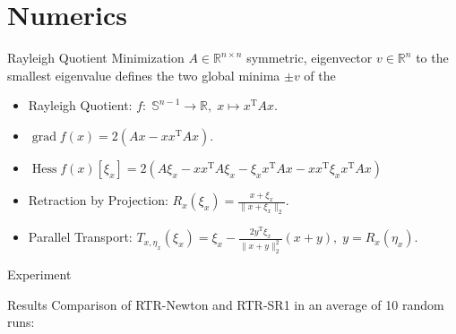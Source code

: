 \documentclass{beamer}
\begin{document}
\section{Numerics}

\begin{frame}{Rayleigh Quotient Minimization}
    $A \in \mathbb{R}^{n \times n}$ symmetric, eigenvector $v \in \mathbb{R}^n$ to the smallest eigenvalue defines the two global minima $\pm v$ of the
    \begin{itemize}
        \item Rayleigh Quotient: $f \colon \; \mathbb{S}^{n-1} \to \mathbb{R}, \; x \mapsto x^{\mathrm{T}} A x$.
        \item $\operatorname{grad} f(x) = 2(Ax - x x^{\mathrm{T}} A x)$.
        \item $\operatorname{Hess} f(x) [\xi_x] = 2 (A \xi_x - x x^{\mathrm{T}} A \xi_x - \xi_x x^{\mathrm{T}} A x - x x^{\mathrm{T}} \xi_x x^{\mathrm{T}} A x)$
        \item Retraction by Projection: $R_x (\xi_x) = \frac{x + \xi_x}{\lVert x + \xi_x \rVert_2}$.
        \item Parallel Transport: $T_{x, \eta_x}(\xi_x) = \xi_x - \frac{2 y^{\mathrm{T}} \xi_x}{\lVert x + y \rVert^{2}_2} (x + y), \; y = R_x(\eta_x)$.
    \end{itemize}
\end{frame}

\begin{frame}{Experiment}
    
\end{frame}


\begin{frame}{Results}
    Comparison of RTR-Newton and RTR-SR1 in an average of 10 random runs:
    \begin{table}[H]
    \end{table}
\end{frame}
\end{document}
